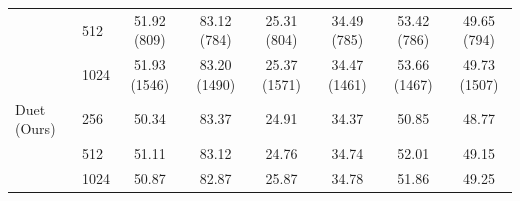 \begin{table}[ht]
{\begin{tabular}{llcccccc}
             & 512 & 51.92 (809) & 83.12 (784) & 25.31 (804) & 34.49 (785) & 53.42 (786) & 49.65 (794) \\
             & 1024 & 51.93 (1546) & 83.20 (1490) & 25.37 (1571) & 34.47 (1461) & 53.66 (1467) & 49.73 (1507) \\
        Duet (Ours) & 256 & 50.34 & 83.37 & 24.91 & 34.37 & 50.85 & 48.77 \\
                    & 512 & 51.11 & 83.12 & 24.76 & 34.74 & 52.01 & 49.15 \\
                    & 1024 & 50.87 & 82.87 & 25.87 & 34.78 & 51.86 & 49.25 \\
        \bottomrule
    \end{tabular}
    }
\end{table}
